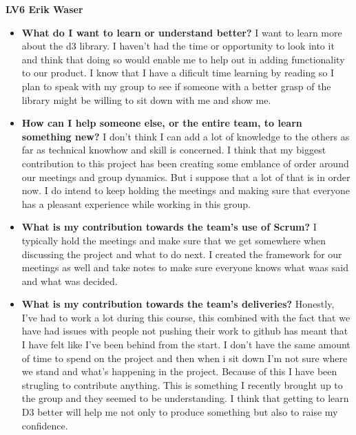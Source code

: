 \documentclass[]{article}
\begin{document}
\textbf{\huge{LV6} Erik Waser}

\begin{itemize}
    \item \textbf{What do I want to learn or understand better?} \newline
    I want to learn more about the d3 library. I haven't had the time or opportunity to look into it and think that doing so would enable me to help out in adding functionality to our product. 
    I know that I have a dificult time learning by reading so I plan to speak with my group to see if someone with a better grasp of the library might be willing to sit down with me and show me. 
    
    
    \item \textbf{How can I help someone else, or the entire team, to learn something new?} \newline
    I don't think I can add a lot of knowledge to the others as far as technical knowhow and skill is concerned. I think that my biggest contribution to this project has been creating some emblance of order around our meetings and group dynamics. But i suppose that a lot of that is in order now. I do intend to keep holding the meetings and making sure that everyone has a pleasant experience while working in this group. 
    
    \item \textbf{What is my contribution towards the team’s use of Scrum?} \newline
    I typically hold the meetings and make sure that we get somewhere when discussing the project and what to do next. I created the framework for our meetings as well and take notes to make sure everyone knows what waas said and what was decided.
    
    \item \textbf{What is my contribution towards the team’s deliveries?} \newline
    Honestly, I've had to work a lot during this course, this combined with the fact that we have had issues with people not pushing their work to github has meant that I have felt like I've been behind from the start. I don't have the same amount of time to spend on the project and then when i sit down I'm not sure where we stand and what's happening in the project. Because of this I have been strugling to contribute anything. This is something I recently brought up to the group and they seemed to be understanding. I think that getting to learn D3 better will help me not only to produce something but also to raise my confidence.
    
 
\end{itemize}
\end{document}
